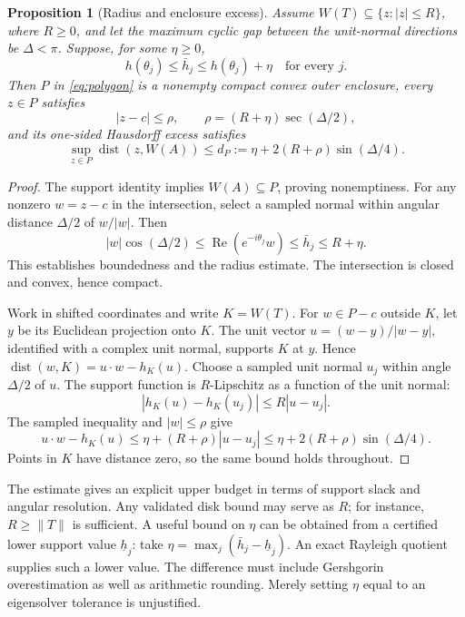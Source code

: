 \documentclass[11pt]{article}
\newcommand{\norm}[1]{\lVert #1\rVert}
\newcommand{\W}{W}
\newcommand{\re}{\operatorname{Re}}
\DeclareMathOperator{\dist}{dist}
\newtheorem{proposition}[theorem]{Proposition}
\theoremstyle{definition}
\theoremstyle{remark}
\numberwithin{equation}{section}
\begin{document}
\begin{proposition}[Radius and enclosure excess]\label{prop:geometry}
Assume \(\W(T)\subseteq\{z:|z|\le R\}\), where \(R\ge0\), and let
the maximum cyclic gap between the unit-normal directions be
\(\Delta<\pi\). Suppose, for some \(\eta\ge0\),
\[
 h(\theta_j)\le\bar h_j\le h(\theta_j)+\eta
 \quad\text{for every }j.
\]
Then \(P\) in \eqref{eq:polygon} is a nonempty compact convex outer
enclosure, every \(z\in P\) satisfies
\[
 |z-c|\le\rho,\qquad
 \rho=(R+\eta)\sec(\Delta/2),
\]
and its one-sided Hausdorff excess satisfies
\begin{equation}\label{eq:hausdorff}
 \sup_{z\in P}\dist(z,\W(A))
 \le d_P:=\eta+2(R+\rho)\sin(\Delta/4).
\end{equation}
\end{proposition}
\begin{proof}
The support identity implies \(\W(A)\subseteq P\), proving nonemptiness.
For any nonzero \(w=z-c\) in the intersection, select a sampled normal
within angular distance \(\Delta/2\) of \(w/|w|\). Then
\[
 |w|\cos(\Delta/2)\le
 \re(e^{-i\theta_j}w)\le\bar h_j\le R+\eta.
\]
This establishes boundedness and the radius estimate. The intersection
is closed and convex, hence compact.

Work in shifted coordinates and write \(K=\W(T)\). For \(w\in P-c\)
outside \(K\), let \(y\) be its Euclidean projection onto \(K\).
The unit vector \(u=(w-y)/|w-y|\), identified with a complex unit normal,
supports \(K\) at \(y\). Hence
\(\dist(w,K)=u\cdot w-h_K(u)\).
Choose a sampled unit normal \(u_j\) within angle \(\Delta/2\) of \(u\).
The support function is \(R\)-Lipschitz as a function of the unit normal:
\[
 |h_K(u)-h_K(u_j)|\le R|u-u_j|.
\]
The sampled inequality and \(|w|\le\rho\) give
\[
 u\cdot w-h_K(u)
 \le \eta+(R+\rho)|u-u_j|
 \le \eta+2(R+\rho)\sin(\Delta/4).
\]
Points in \(K\) have distance zero, so the same bound holds throughout.
\end{proof}

The estimate gives an explicit upper budget in terms of support slack
and angular resolution.
Any validated disk bound may serve as \(R\); for instance,
\(R\ge\norm{T}\) is sufficient.
A useful bound on \(\eta\) can be obtained from a certified lower support
value \(\underline h_j\): take
\(\eta=\max_j(\bar h_j-\underline h_j)\).
An exact Rayleigh quotient supplies such a lower value.
The difference must include Gershgorin overestimation as well as arithmetic
rounding. Merely setting \(\eta\) equal to an eigensolver tolerance is
unjustified.
\end{document}
